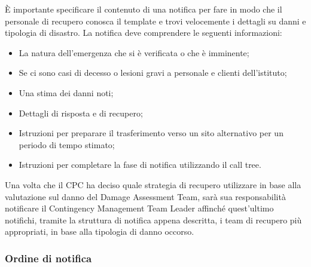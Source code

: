 \documentclass[12pt, a4paper, titlepage]{report}
\begin{document}
	È importante specificare il contenuto di una notifica per fare in modo che il personale di recupero conosca il template e trovi velocemente i dettagli su danni e tipologia di disastro. La notifica deve comprendere le seguenti informazioni:
	\begin{itemize}
		\item La natura dell'emergenza che si è verificata o che è imminente;
		\item Se ci sono casi di decesso o lesioni gravi a personale e clienti dell'istituto;
		\item Una stima dei danni noti;
		\item Dettagli di risposta e di recupero;
		\item Istruzioni per preparare il trasferimento verso un sito alternativo per un periodo di tempo stimato;
		\item Istruzioni per completare la fase di notifica utilizzando il call tree.
	\end{itemize}
	Una volta che il CPC ha deciso quale strategia di recupero utilizzare in base alla valutazione sul danno del Damage Assessment Team, sarà sua responsabilità notificare il Contingency Management Team Leader affinché quest'ultimo notifichi, tramite la struttura di notifica appena descritta, i team di recupero più appropriati, in base alla tipologia di danno occorso.
	
	\subsubsection{Ordine di notifica}
	
\end{document}
